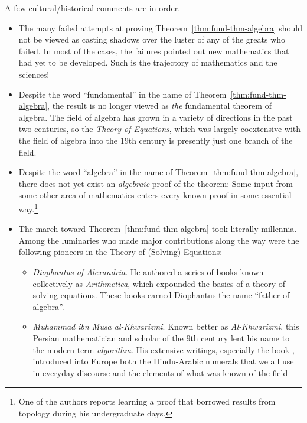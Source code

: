 A few cultural/historical comments are in order.
\begin{itemize}
\item
The many failed attempts at proving Theorem~\ref{thm:fund-thm-algebra}
should not be viewed as casting shadows over the luster of any of the
greats who failed.  In most of the cases, the failures pointed out new
mathematics that had yet to be developed.  Such is the trajectory of
mathematics and the sciences!
\item
Despite the word ``fundamental'' in the name of
Theorem~\ref{thm:fund-thm-algebra}, the result is no longer viewed as
{\em the} fundamental theorem of algebra.  The field of algebra has
grown in a variety of directions in the past two centuries, so the
{\em Theory of Equations}, which was largely coextensive with the
field of algebra into the 19th century is presently just one branch of
the field.
\item
Despite the word ``algebra'' in the name of
Theorem~\ref{thm:fund-thm-algebra}, there does not yet exist an {\em
  algebraic} proof of the theorem: Some input from some other area of
mathematics enters every known proof in some essential
way.\footnote{One of the authors reports learning a proof that
  borrowed results from topology during his undergraduate days.}
\item
The march toward Theorem~\ref{thm:fund-thm-algebra} took literally
millennia.  Among the luminaries who made major contributions along
the way were the following pioneers in the Theory of (Solving)
Equations:
  \begin{itemize}
  \item
{\it Diophantus of Alexandria}.  
He authored a series of books known collectively as {\it Arithmetica},
which expounded the basics of a theory of solving equations.  These
books earned Diophantus the name ``father of algebra''.
   \item
{\it Muhammad ibn Musa al-Khwarizmi}.
Known better as {\em Al-Khwarizmi}, this Persian mathematician and
scholar of the $9$th century lent his name to the modern term {\it
  algorithm}. His
extensive writings, especially the book \cite{Al-Khwarizmi},
introduced into Europe both the Hindu-Arabic numerals
 that we all use in everyday
discourse and the elements of what was known  of the field

\end{itemize}
\end{itemize}
